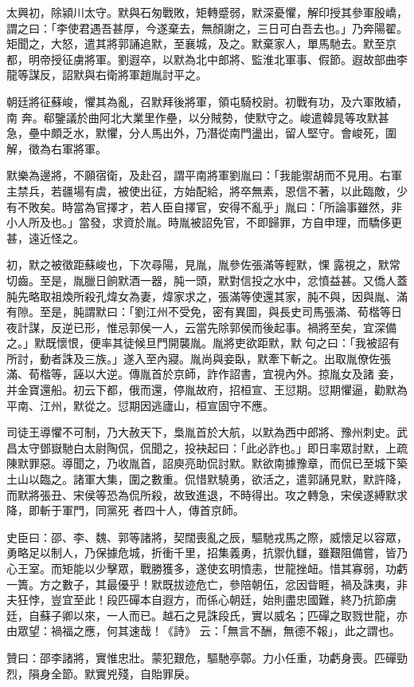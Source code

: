 \begin{pinyinscope}
 太興初，除潁川太守。默與石匆戰敗，矩轉蹙弱，默深憂懼，解印授其參軍殷嶠，謂之曰：「李使君遇吾甚厚，今遂棄去，無顏謝之，三日可白吾去也。」乃奔陽翟。矩聞之，大怒，遣其將郭誦追默，至襄城，及之。默棄家人，單馬馳去。默至京都，明帝授征虜將軍。劉遐卒，以默為北中郎將、監淮北軍事、假節。遐故部曲李龍等謀反，詔默與右衛將軍趙胤討平之。



 朝廷將征蘇峻，懼其為亂，召默拜後將軍，領屯騎校尉。初戰有功，及六軍敗績，南
 奔。郗鑒議於曲阿北大業里作壘，以分賊勢，使默守之。峻遣韓晁等攻默甚急，壘中頗乏水，默懼，分人馬出外，乃潛從南門盪出，留人堅守。會峻死，圍解，徵為右軍將軍。



 默樂為邊將，不願宿衛，及赴召，謂平南將軍劉胤曰：「我能禦胡而不見用。右軍主禁兵，若疆場有虞，被使出征，方始配給，將卒無素，恩信不著，以此臨敵，少有不敗矣。時當為官擇才，若人臣自擇官，安得不亂乎」胤曰：「所論事雖然，非小人所及也。」當發，求資於胤。時胤被詔免官，不即歸罪，方自申理，而驕侈更甚，遠近怪之。



 初，默之被徵距蘇峻也，下次尋陽，見胤，胤參佐張滿等輕默，惈
 露視之，默常切齒。至是，胤臘日餉默酒一器，肫一頭，默對信投之水中，忿憤益甚。又僑人蓋肫先略取祖煥所殺孔煒女為妻，煒家求之，張滿等使還其家，肫不與，因與胤、滿有隙。至是，肫謂默曰：「劉江州不受免，密有異圖，與長史司馬張滿、荀楷等日夜計謀，反逆已形，惟忌郭侯一人，云當先除郭侯而後起事。禍將至矣，宜深備之。」默既懷恨，便率其徒候旦門開襲胤。胤將吏欲距默，默句之曰：「我被詔有所討，動者誅及三族。」遂入至內寢。胤尚與妾臥，默牽下斬之。出取胤僚佐張滿、荀楷等，誣以大逆。傳胤首於京師，詐作詔書，宜視內外。掠胤女及諸
 妾，并金寶還船。初云下都，俄而還，停胤故府，招桓宣、王愆期。愆期懼逼，勸默為平南、江州，默從之。愆期因逃廬山，桓宣固守不應。



 司徒王導懼不可制，乃大赦天下，梟胤首於大航，以默為西中郎將、豫州刺史。武昌太守鄧嶽馳白太尉陶侃，侃聞之，投袂起曰：「此必詐也。」即日率眾討默，上疏陳默罪惡。導聞之，乃收胤首，詔庾亮助侃討默。默欲南據豫章，而侃已至城下築土山以臨之。諸軍大集，圍之數重。侃惜默驍勇，欲活之，遣郭誦見默，默許降，而默將張丑、宋侯等恐為侃所殺，故致進退，不時得出。攻之轉急，宋侯遂縛默求降，即斬于軍門，同黨死
 者四十人，傳首京師。



 史臣曰：邵、李、魏、郭等諸將，契闊喪亂之辰，驅馳戎馬之際，威懷足以容眾，勇略足以制人，乃保據危城，折衝千里，招集義勇，抗禦仇讎，雖艱阻備嘗，皆乃心王室。而矩能以少擊眾，戰勝獲多，遂使玄明憤恚，世龍挫衄。惜其寡弱，功虧一簣。方之數子，其最優乎！默既拔迹危亡，參陪朝伍，忿因眥睚，禍及誅夷，非夫狂悖，豈宜至此！段匹磾本自遐方，而係心朝廷，始則盡忠國難，終乃抗節虜廷，自蘇子卿以來，一人而已。越石之見誅段氏，實以威名；匹磾之取戮世龍，亦由眾望：禍福之應，何其速哉！《詩》
 云：「無言不酬，無德不報」，此之謂也。



 贊曰：邵李諸將，實惟忠壯。蒙犯艱危，驅馳亭鄣。力小任重，功虧身喪。匹磾勁烈，隕身全節。默實兇殘，自貽罪戾。



\end{pinyinscope}